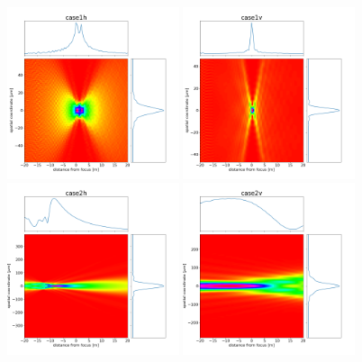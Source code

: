 \documentclass[]{article}
\begin{document}
  

\thispagestyle{empty}


\begin{figure}
\centering
\includegraphics[width=0.45\textwidth]{figures/case1h_caustic.png}
\includegraphics[width=0.45\textwidth]{figures/case1v_caustic.png}
\includegraphics[width=0.45\textwidth]{figures/case2h_caustic.png}
\includegraphics[width=0.45\textwidth]{figures/case2v_caustic.png}

\end{figure}
\end{document}
